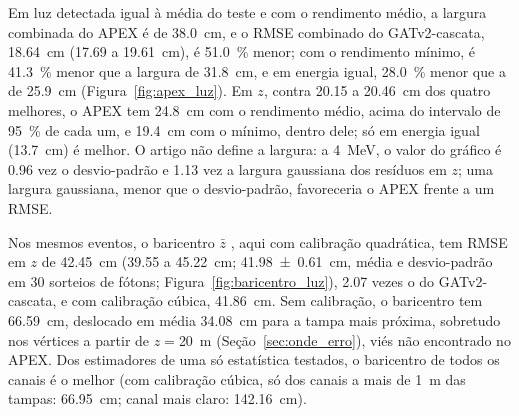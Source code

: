 Em luz detectada igual à média do teste e com o rendimento médio, a largura combinada do APEX \cite{marinho2025apex} é de \qty{38.0}{\cm}, e o RMSE combinado do GATv2-cascata, \qty{18.64}{\cm} (\num{17.69} a \qty{19.61}{\cm}), é \qty{51.0}{\percent} menor; com o rendimento mínimo, é \qty{41.3}{\percent} menor que a largura de \qty{31.8}{\cm}, e em energia igual, \qty{28.0}{\percent} menor que a de \qty{25.9}{\cm} (Figura~\ref{fig:apex_luz}). Em $z$, contra \num{20.15} a \qty{20.46}{\cm} dos quatro melhores, o APEX tem \qty{24.8}{\cm} com o rendimento médio, acima do intervalo de \qty{95}{\percent} de cada um, e \qty{19.4}{\cm} com o mínimo, dentro dele; só em energia igual (\qty{13.7}{\cm}) é melhor. O artigo não define a largura: a \qty{4}{\MeV}, o valor do gráfico é \num{0.96} vez o desvio-padrão e \num{1.13} vez a largura gaussiana dos resíduos em $z$; uma largura gaussiana, menor que o desvio-padrão, favoreceria o APEX frente a um RMSE.

{ Nos mesmos eventos, o baricentro $\bar{z}$ \cite{marinho2025apex}, aqui com calibração quadrática, tem RMSE em $z$ de \qty{42.45}{\cm} (\num{39.55} a \qty{45.22}{\cm}; \qty[uncertainty-mode = separate, separate-uncertainty-units = single]{41.98 \pm 0.61}{\cm}, média e desvio-padrão em \num{30} sorteios de fótons; Figura~\ref{fig:baricentro_luz}), \num{2.07} vezes o do GATv2-cascata, e com calibração cúbica, \qty{41.86}{\cm}. Sem calibração, o baricentro tem \qty{66.59}{\cm}, deslocado em média \qty{34.08}{\cm} para a tampa mais próxima, sobretudo nos vértices a partir de $z = {}$\qty{20}{\m} (Seção~\ref{sec:onde_erro}), viés não encontrado no APEX. Dos estimadores de uma só estatística testados, o baricentro de todos os canais é o melhor (com calibração cúbica, só dos canais a mais de \qty{1}{\m} das tampas: \qty{66.95}{\cm}; canal mais claro: \qty{142.16}{\cm}).\par}

